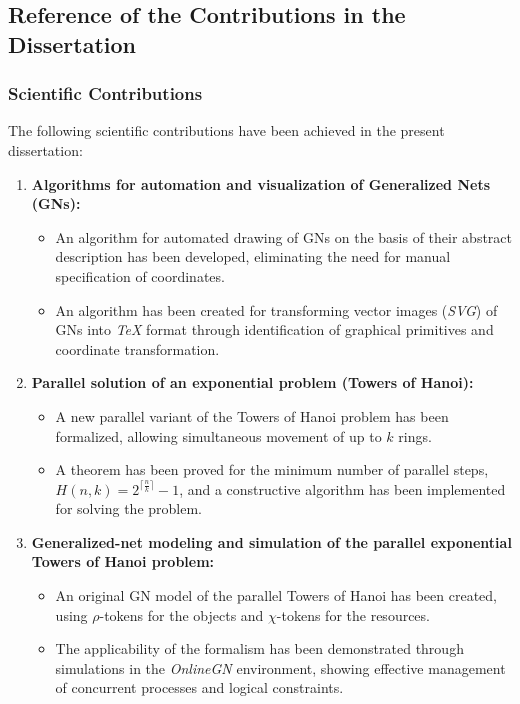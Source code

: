 	\subsection*{Reference of the Contributions in the Dissertation}
	
	\subsubsection*{Scientific Contributions}
	
	The following scientific contributions have been achieved in the present dissertation:
	
	\begin{enumerate}[label=\arabic*., leftmargin=*]
		\item \textbf{Algorithms for automation and visualization of Generalized Nets (GNs):}
		\begin{itemize}
			\item An algorithm for automated drawing of GNs on the basis of their abstract description has been developed, eliminating the need for manual specification of coordinates.
			\item An algorithm has been created for transforming vector images (\textit{SVG}) of GNs into \textit{TeX} format through identification of graphical primitives and coordinate transformation.
		\end{itemize}
		
		\item \textbf{Parallel solution of an exponential problem (Towers of Hanoi):}
		\begin{itemize}
			\item A new parallel variant of the Towers of Hanoi problem has been formalized, allowing simultaneous movement of up to $k$ rings.
			\item A theorem has been proved for the minimum number of parallel steps, $H(n,k) = 2^{\bigl\lceil \textstyle \frac{n}{k} \bigr\rceil} - 1$, and a constructive algorithm has been implemented for solving the problem.
		\end{itemize}
		
		\item \textbf{Generalized-net modeling and simulation of the parallel exponential Towers of Hanoi problem:}
		\begin{itemize}
			\item An original GN model of the parallel Towers of Hanoi has been created, using $\rho$-tokens for the objects and $\chi$-tokens for the resources.
			\item The applicability of the formalism has been demonstrated through simulations in the \textit{OnlineGN} environment, showing effective management of concurrent processes and logical constraints.
		\end{itemize}
	\end{enumerate}
	
